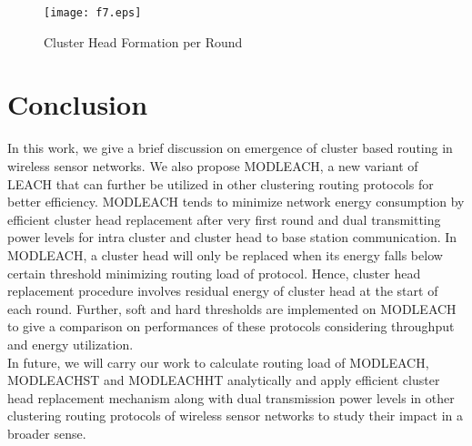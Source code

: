 \documentclass[10pt, conference, compsocconf]{IEEEtran}
\begin{document}
\begin{figure}
\begin{center}
\texttt{[image: f7.eps]}
\caption{Cluster Head Formation per Round}
\end{center}
\end{figure}

\section{Conclusion}
In this work, we give a brief discussion on emergence of cluster based routing in wireless sensor networks. We also propose MODLEACH, a new variant of LEACH that can further be utilized in other clustering routing protocols for better efficiency. MODLEACH tends to minimize network energy consumption by efficient cluster head replacement after very first round and dual transmitting power levels for intra cluster and cluster head to base station communication. In MODLEACH, a cluster head will only be replaced when its energy falls below certain threshold minimizing routing load of protocol. Hence, cluster head replacement procedure involves residual energy of cluster head at the start of each round. Further, soft and hard thresholds are implemented on MODLEACH to give a comparison on performances of these protocols considering throughput and energy utilization.
\\In future, we will carry our work to calculate routing load of MODLEACH, MODLEACHST and MODLEACHHT analytically and apply efficient cluster head replacement mechanism along with dual transmission power levels in other clustering routing protocols of wireless sensor networks to study their impact in a broader sense.
\end{document}
